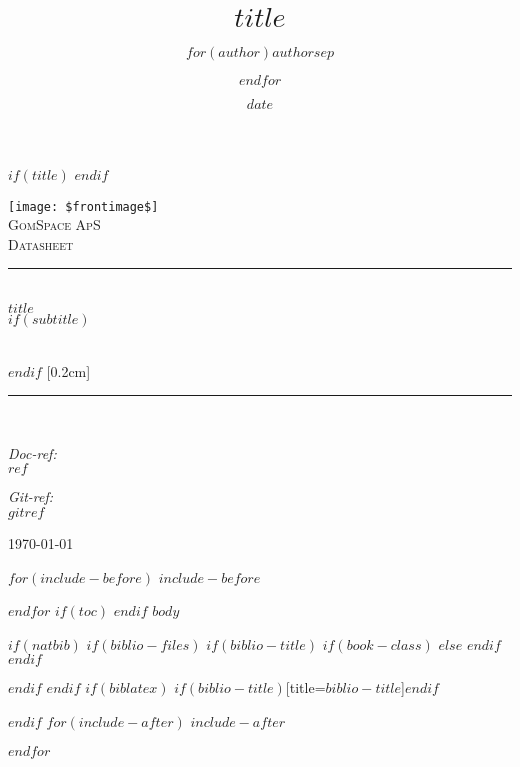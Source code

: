 \documentclass[9pt,a4paper]{article}
\title{$title$}
\author{$for(author)$$author$$sep$ \and $endfor$}
\date{$date$}
\begin{document}
$if(title)$
$endif$

\newcommand{\HRule}{\rule{\linewidth}{0.5mm}}
\begin{titlepage}
\begin{center}
\texttt{[image: \$frontimage\$]}\\[1cm]    
\textsc{\LARGE GomSpace ApS}\\[1.5cm]
\textsc{\Large Datasheet}\\[0.5cm]
\HRule \\[0.4cm]
{ \huge \bfseries $title$}\\[0.2cm]
$if(subtitle)$

\\
$endif$
[0.2cm]
\HRule \\[1.5cm]
% 
\begin{minipage}{0.4\textwidth}
\begin{flushleft} \large
\emph{Doc-ref:} \\
$ref$
\end{flushleft}
\end{minipage}
\begin{minipage}{0.4\textwidth}
\begin{flushright} \large
\emph{Git-ref:} \\
$gitref$ 
\end{flushright}
\end{minipage}
\vfill
{\large \today}
\end{center}
\end{titlepage}



$for(include-before)$
$include-before$

$endfor$
$if(toc)$
{
\hypersetup{linkcolor=black}
\newpage
\setcounter{tocdepth}{2}
\tableofcontents
}
$endif$
\newpage
$body$

$if(natbib)$
$if(biblio-files)$
$if(biblio-title)$
$if(book-class)$
\renewcommand\bibname{$biblio-title$}
$else$
\renewcommand\refname{$biblio-title$}
$endif$
$endif$


$endif$
$endif$
$if(biblatex)$
\printbibliography$if(biblio-title)$[title=$biblio-title$]$endif$

$endif$
$for(include-after)$
$include-after$

$endfor$
\end{document}
